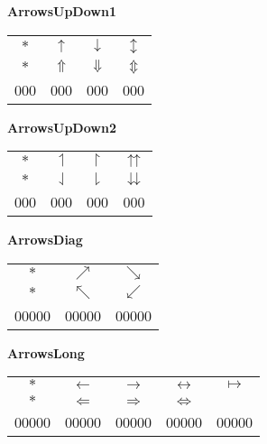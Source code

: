 \documentclass[12pt]{report}
\newlength{\mine}
\newlength{\niz}
\def\pmb{}
\begin{document}
\newpage

\textbf{ArrowsUpDown1}
\par\nobreak\vspace{2mm}
\begin{tabular}{|c|ccc|}
  \hline
   $\pmb *             $&
   $\pmb\uparrow       $&
   $\pmb\downarrow     $&
   $\pmb\updownarrow   $\\[\mine]
   $\pmb *             $&
   $\pmb\Uparrow       $&
   $\pmb\Downarrow     $&
   $\pmb\Updownarrow   $\\[\niz]
  \hline\hline
  000&000&000&000\\
  \hline
\end{tabular}
\goodbreak\par\vspace{3mm}

\textbf{ArrowsUpDown2}
\par\nobreak\vspace{2mm}
\begin{tabular}{|c|ccc|}
  \hline
   $\pmb *                $&
   $\pmb\upharpoonleft    $&
   $\pmb\upharpoonright   $&
   $\pmb\upuparrows       $\\[\mine]
   $\pmb *                $&
   $\pmb\downharpoonleft  $&
   $\pmb\downharpoonright $&
   $\pmb\downdownarrows   $\\[\niz]
  \hline\hline
  000&000&000&000\\
  \hline
\end{tabular}
\goodbreak\par\vspace{3mm}

\textbf{ArrowsDiag}
\par\nobreak\vspace{2mm}
\begin{tabular}{|c|cc|}
  \hline
   $\pmb *               $&
   $\pmb\nearrow         $&
   $\pmb\searrow         $\\[\mine]
   $\pmb *               $&
   $\pmb\nwarrow         $&
   $\pmb\swarrow         $\\[\niz]
  \hline\hline
  00000&00000&00000\\
  \hline
\end{tabular}
\goodbreak\par\vspace{3mm}

\textbf{ArrowsLong}
\par\nobreak\vspace{2mm}
\begin{tabular}{|c|cccc|}
  \hline
   $\pmb *                  $&
   $\pmb\longleftarrow      $&
   $\pmb\longrightarrow     $&
   $\pmb\longleftrightarrow $&
   $\pmb\longmapsto         $\\[\mine]
   $\pmb *                  $&
   $\pmb\Longleftarrow      $&
   $\pmb\Longrightarrow     $&
   $\pmb\Longleftrightarrow $&
   $                        $\\[\niz]
  \hline\hline
  00000&00000&00000&00000&00000\\
  \hline
\end{tabular}
\goodbreak\par\vspace{3mm}
\end{document}
